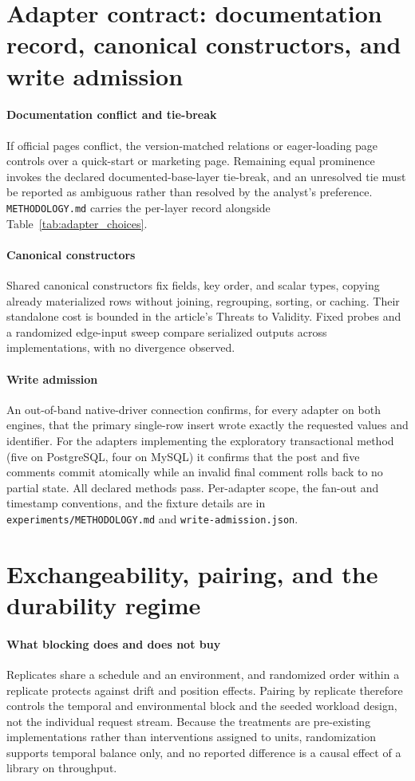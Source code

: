 \documentclass[11pt,a4paper]{article}
\begin{document}
\section{Adapter contract: documentation record, canonical constructors, and write admission}
\label{sup:adapter-detail}
\paragraph{Documentation conflict and tie-break} If official pages conflict, the version-matched
relations or eager-loading page controls over a quick-start or marketing page. Remaining equal
prominence invokes the declared documented-base-layer tie-break, and an unresolved tie must be
reported as ambiguous rather than resolved by the analyst's preference. \texttt{METHODOLOGY.md}
carries the per-layer record alongside Table~\ref{tab:adapter_choices}.

\paragraph{Canonical constructors} Shared canonical constructors fix fields, key order, and scalar
types, copying already materialized rows without joining, regrouping, sorting, or caching. Their
standalone cost is bounded in the article's Threats to Validity. Fixed probes and a randomized
edge-input sweep compare serialized outputs across implementations, with no divergence observed.

\paragraph{Write admission} An out-of-band native-driver connection confirms, for every adapter on
both engines, that the primary single-row insert wrote exactly the requested values and identifier.
For the adapters implementing the exploratory transactional method (five on PostgreSQL, four on
MySQL) it confirms that the post and five comments commit atomically while an invalid final comment
rolls back to no partial state. All declared methods pass. Per-adapter scope, the fan-out and
timestamp conventions, and the fixture details are in \texttt{experiments/METHODOLOGY.md} and
\texttt{write-admission.json}.

\section{Exchangeability, pairing, and the durability regime}
\label{sup:analysis-detail}
\paragraph{What blocking does and does not buy} Replicates share a schedule and an environment, and
randomized order within a replicate protects against drift and position effects. Pairing by
replicate therefore controls the temporal and environmental block and the seeded workload design,
not the individual request stream. Because the treatments are pre-existing implementations rather
than interventions assigned to units, randomization supports temporal balance only, and no reported
difference is a causal effect of a library on throughput.
\end{document}
